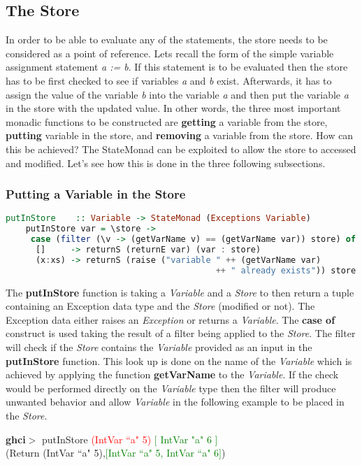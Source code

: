 \documentclass[a4paper, onecolumn]{article}
\begin{document}
    \subsection{The Store}
    In order to be able to evaluate any of the statements, the store needs to be considered as a point of reference. Lets recall the form of the simple variable assignment statement \textit{a := b}. If this statement is to be evaluated then the store has to be first checked to see if variables \textit{a} and \textit{b} exist. Afterwards, it has to assign the value of the variable \textit{b} into the variable \textit{a} and then put the variable \textit{a} in the store with the updated value. In other words, the three most important monadic functions to be constructed are \textbf{getting} a variable from the store, \textbf{putting} variable in the store, and \textbf{removing} a variable from the store. How can this be achieved? The StateMonad can be exploited to allow the store to accessed and modified. Let's see how this is done in the three following subsections.
    
    \subsubsection{Putting a Variable in the Store}
    
    \begin{tcolorbox}
    \begin{lstlisting}[language=Haskell] 
    putInStore    :: Variable -> StateMonad (Exceptions Variable) 
    putInStore var = \store -> 
     case (filter (\v -> (getVarName v) == (getVarName var)) store) of
      []     -> returnS (returnE var) (var : store)                               
      (x:xs) -> returnS (raise ("variable " ++ (getVarName var)
                                          ++ " already exists")) store
    \end{lstlisting}
    \end{tcolorbox}
    
    \noindent The \textbf{putInStore} function is taking a \textit{Variable} and a \textit{Store} to then return a tuple containing an Exception data type and the \textit{Store} (modified or not). The Exception data either raises an \textit{Exception} or returns a \textit{Variable}. The \textbf{case of} construct is used taking the result of a filter being applied to the \textit{Store}. The filter will check if the \textit{Store} contains the \textit{Variable} provided as an input in the \textbf{putInStore} function. This look up is done on the name of the \textit{Variable} which is achieved by applying the function \textbf{getVarName} to the \textit{Variable}. If the check would be performed directly on the \textit{Variable} type then the filter will produce unwanted behavior and allow \textit{Variable} in the following example to be placed in the \textit{Store}. 
    \begin{center}
            \textbf{ghci$>$} putInStore \textcolor{red}{(IntVar ``a" 5)} \textcolor{green}{ $\big[$ IntVar "a" 6 $\big]$} \\
             (Return (IntVar ``a" 5),\textcolor{green}{$\big[$IntVar ``a" 5, IntVar ``a" 6$\big]$})
        \end{center}
    
\end{document}
